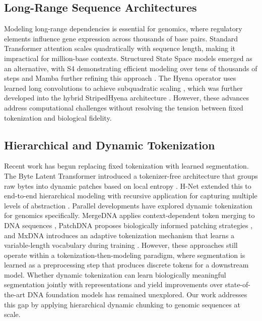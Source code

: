 \documentclass{article}
\theoremstyle{plain}
\theoremstyle{definition}
\theoremstyle{remark}
\begin{document}
\subsection{Long-Range Sequence Architectures}

Modeling long-range dependencies is essential for genomics, where regulatory elements influence gene expression across thousands of base pairs. Standard Transformer attention scales quadratically with sequence length, making it impractical for million-base contexts. Structured State Space models emerged as an alternative, with S4 demonstrating efficient modeling over tens of thousands of steps \citep{gu2022efficientlymodelinglongsequences} and Mamba further refining this approach \citep{gu2024mambalineartimesequencemodeling}. The Hyena operator uses learned long convolutions to achieve subquadratic scaling \citep{poli2023hyenahierarchylargerconvolutional}, which was further developed into the hybrid StripedHyena architecture \citep{Nguyen2024}. However, these advances address computational challenges without resolving the tension between fixed tokenization and biological fidelity.

\subsection{Hierarchical and Dynamic Tokenization}

Recent work has begun replacing fixed tokenization with learned segmentation. The Byte Latent Transformer introduced a tokenizer-free architecture that groups raw bytes into dynamic patches based on local entropy \citep{pagnoni2024bytelatenttransformerpatches}. H-Net extended this to end-to-end hierarchical modeling with recursive application for capturing multiple levels of abstraction \citep{hwang2025dynamicchunkingendtoendhierarchical}. Parallel developments have explored dynamic tokenization for genomics specifically. MergeDNA applies context-dependent token merging to DNA sequences \citep{li2025mergednacontextawaregenomemodeling}, PatchDNA proposes biologically informed patching strategies \citep{DelVecchio2025}, and MxDNA introduces an adaptive tokenization mechanism that learns a variable-length vocabulary during training \citep{qiao2024modeldecidestokenizeadaptive}. However, these approaches still operate within a tokenization-then-modeling paradigm, where segmentation is learned as a preprocessing step that produces discrete tokens for a downstream model. Whether dynamic tokenization can learn biologically meaningful segmentation jointly with representations and yield improvements over state-of-the-art DNA foundation models has remained unexplored. Our work addresses this gap by applying hierarchical dynamic chunking to genomic sequences at scale.
\end{document}
